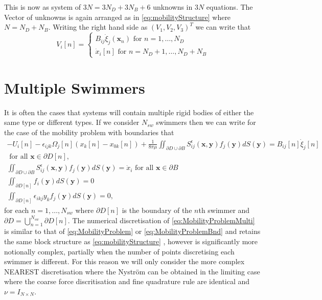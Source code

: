 This is now as system of $3N = 3N_D+3N_B + 6$ unknowns in $3N$ equations. The Vector of unknowns is again arranged as in \cref{eq:mobilityStructure} where $N=N_D+N_B$. Writing the right hand side as $(V_1,V_2,V_3)^T$ we can write that
\begin{equation*}
    V_i[n] = \begin{cases} B_{i j} \dot{\xi}_{j}({\bm{x}}_{n}) \text{ for } n=1,\dots,N_D \\ \dot{x}_i[n] \text{ for } n=N_D+1,\dots,N_D+N_B \end{cases}
\end{equation*}

\section{Multiple Swimmers}
It is often the cases that systems will contain multiple rigid bodies of either the same type or different types. If we consider $N_{sw}$ swimmers then we can write for the case of the mobility problem with boundaries that
\begin{equation}
\label{eq:MobilityProblemMulti}
\begin{gathered}
    -U_{i}[n]-\epsilon_{i j k} \Omega_{j}[n]\left(x_{k}[n]-x_{0 k}[n]\right)+\frac{1}{8 \pi\mu} \iint_{\partial D \cup \partial B} S_{i j}^{\epsilon}(\bm{x}, \bm{y}) f_{j}(\bm{y}) d S({\bm{y}})=B_{i j}[n] \dot{\xi}_{j}[n] \\ \text { for all } \bm{x} \in \partial D[n], \\
    \iint_{\partial D \cup \partial B} S_{i j}^{\epsilon}(\bm{x}, \bm{y}) f_{j}(\bm{y}) d S({\bm{y}}) = \dot{x}_i \text { for all } \bm{x} \in \partial B \\
    \iint_{\partial D[n]} f_{i}(\bm{y}) d S({\bm{y}})=0 \\
    \iint_{\partial D[n]} \epsilon_{i k j} y_{k} f_{j}(\bm{y}) d S({\bm{y}})=0,
\end{gathered}
\end{equation}
for each $n=1,\dots,N_{sw}$ where $\partial D[n]$ is the boundary of the $n$th swimmer and $\partial D = \bigcup_{n=1}^{N_{sw}} \partial D[n]$. The numerical discretisation of \cref{eq:MobilityProblemMulti} is similar to that of  \cref{eq:MobilityProblem} or \cref{eq:MobilityProblemBnd} and retains the same block structure as \cref{eq:mobilityStructure} , however is significantly more notionally complex, partially when the number of points discretising each swimmer is different. For this reason we will only consider the more complex NEAREST discretisation where the Nyström can be obtained in the limiting case where the coarse force discritisation and fine quadrature rule are identical and $\nu = I_{N \times N}$.


